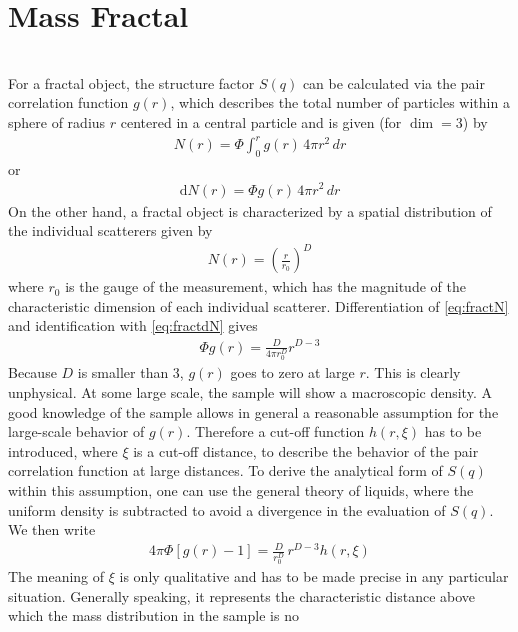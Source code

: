 \section{Mass Fractal}~\\
\label{sect:SQ4clusteraggregates}
For a fractal object, the structure factor $S(q)$ can be calculated
\cite{Teixeira1988,Teixeira1986,Schmidt1991,Sorensen1999,Sorensen1992,Hurd1988,Lin1989,Lin1990,Lin1990a,Lin1990b} via the pair correlation function $g(r)$, which describes the total number of
particles within a sphere of radius $r$ centered in a central
particle and is given (for $\dim = 3$) by
\begin{align}
N(r) = \Phi \int_0^r g(r) \, 4\pi r^2 \, dr
\end{align}
or
\begin{align}
\textrm{d}N(r) = \Phi  g(r) \, 4\pi r^2 \, dr \label{eq:fractdN}
\end{align}
On the other hand, a fractal object is characterized by a spatial
distribution of the individual scatterers given by
\begin{align}
N(r) = \left( \frac{r}{r_0} \right)^D \label{eq:fractN}
\end{align}
where $r_0$ is the gauge of the measurement, which has
the magnitude of the characteristic dimension of each
individual scatterer.
Differentiation of \ref{eq:fractN} and identification with \ref{eq:fractdN}
gives
\begin{align}
\Phi g(r) = \frac{D}{4\pi r_0^D} r^{D-3}
\end{align}
Because $D$ is smaller than 3, $g(r)$ goes to zero at
large $r$. This is clearly unphysical.
At some large scale, the sample will show a
macroscopic density. A good knowledge of the sample
allows in general a reasonable assumption for the
large-scale behavior of $g(r)$. Therefore a cut-off function
$h(r,\xi)$ has to be introduced, where $\xi$ is a cut-off distance, to
describe the behavior of the pair correlation function
at large distances. To derive the analytical form of
$S(q)$ within this assumption, one can use the general
theory of liquids, where the uniform density is subtracted
to avoid a divergence in the evaluation of $S(q)$.
We then write
\begin{align}
4\pi\Phi[g(r)-1] = \frac{D}{r_0^D} \, r^{D-3} h(r,\xi)
\label{eq:fract_g(r)-1}
\end{align}
The meaning of $\xi$ is only qualitative and has to be
made precise in any particular situation. Generally
speaking, it represents the characteristic distance
above which the mass distribution in the sample is no
